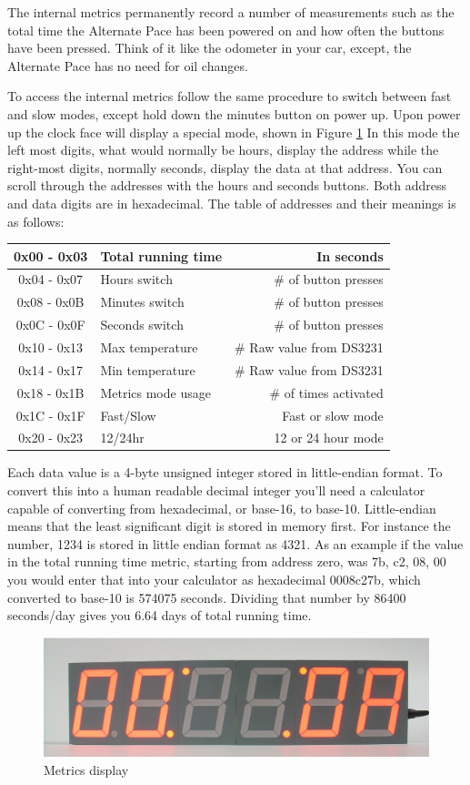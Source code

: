 \documentclass{article}
\begin{document}
The internal metrics permanently record a number of measurements such as the
total time the Alternate Pace has been powered on and how often the buttons
have been pressed. Think of it like the odometer in your car, except, the
Alternate Pace has no need for oil changes.

To access the internal metrics follow the same procedure to switch between fast
and slow modes, except hold down the minutes button on power up. Upon power up
the clock face will display a special mode, shown in Figure \ref{fig:metrics}
In this mode the left most digits, what would normally be hours, display the
address while the right-most digits, normally seconds, display the data at that
address. You can scroll through the addresses with the hours and seconds
buttons. Both address and data digits are in hexadecimal. The table of
addresses and their meanings is as follows:

\medskip

\begin{tabular}{|c|l|r|}
\hline
0x00 - 0x03 & Total running time & In seconds \\ \hline
0x04 - 0x07 & Hours switch & \# of button presses \\ \hline
0x08 - 0x0B & Minutes switch & \# of button presses \\ \hline
0x0C - 0x0F & Seconds switch & \# of button presses \\ \hline
0x10 - 0x13 & Max temperature & \# Raw value from DS3231 \\ \hline
0x14 - 0x17 & Min temperature & \# Raw value from DS3231 \\ \hline
0x18 - 0x1B & Metrics mode usage& \# of times activated\\ \hline
0x1C - 0x1F & Fast/Slow & Fast or slow mode \\ \hline
0x20 - 0x23 & 12/24hr & 12 or 24 hour mode \\ \hline
\end{tabular}

\medskip

Each data value is a 4-byte unsigned integer stored in little-endian format. To
convert this into a human readable decimal integer you'll need a calculator
capable of converting from hexadecimal, or base-16, to base-10. Little-endian
means that the least significant digit is stored in memory first. For instance
the number, 1234 is stored in little endian format as 4321. As an example if
the value in the total running time metric, starting from address zero, was 7b,
c2, 08, 00 you would enter that into your calculator as hexadecimal 0008c27b,
which converted to base-10 is 574075 seconds. Dividing that number by 86400
seconds/day gives you 6.64 days of total running time.

\begin{figure}
\centering
\includegraphics[width=4.75in]{figures/metrics.eps}
\caption{Metrics display}
\label{fig:metrics}
\end{figure}
\end{document}
